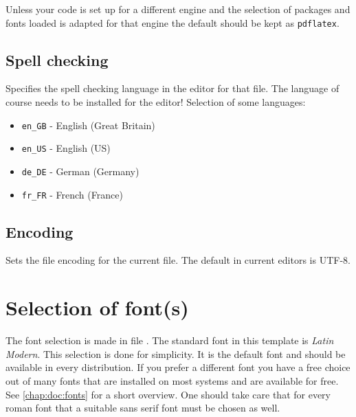 Unless your code is set up for a different engine and the selection of packages and fonts loaded is adapted for that engine the default should be kept as \texttt{pdflatex}. 

\subsection{Spell checking}
\label{sec:doc:magiccomments:spell}

\begin{latexcode}
\end{latexcode}
%
Specifies the spell checking language in the editor for that file. 
The language of course needs to be installed for the editor!
%
Selection of some languages:
\begin{itemize}[noitemsep]
\item \texttt{en\_GB} - English (Great Britain)
\item \texttt{en\_US} - English (US)
\item \texttt{de\_DE} - German (Germany)
\item \texttt{fr\_FR} - French (France)
\end{itemize}

\subsection{Encoding}
\label{sec:doc:magiccomments:encoding}

\begin{latexcode}
\end{latexcode}
%
Sets the file encoding for the current file. The default in current editors is UTF-8.

\section{Selection of font(s)}
\label{sec:doc:faq:fonts}

The font selection is made in file . The standard font in this template is \emph{Latin Modern}. This selection is done for simplicity. It is the default \latex font and should be available in every distribution. If you prefer a different font you have a free choice out of many fonts that are installed on most systems and are available for free. See \cref{chap:doc:fonts} for a short overview. One should take care that for every roman font that a suitable sans serif font must be chosen as well.


